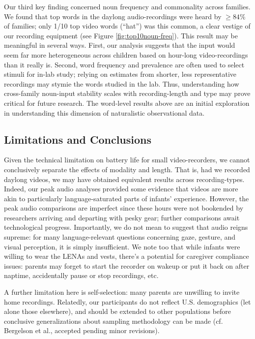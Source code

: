 \documentclass[man]{apa6}
\theoremstyle{definition}
\theoremstyle{definition}
\theoremstyle{definition}
\theoremstyle{remark}
\begin{document}
Our third key finding concerned noun frequency and commonality across
families. We found that top words in the daylong audio-recordings were
heard by \(\geq84\%\) of families; only 1/10 top video words
(\enquote{hat}) was this common, a clear vestige of our recording
equipment (see Figure \ref{fig:top10noun-freq}). This result may be
meaningful in several ways. First, our analysis suggests that the input
would seem far more heterogeneous across children based on hour-long
video-recordings than it really is. Second, word frequency and
prevalence are often used to select stimuli for in-lab study; relying on
estimates from shorter, less representative recordings may stymie the
words studied in the lab. Thus, understanding how cross-family
noun-input stability scales with recording-length and type may prove
critical for future research. The word-level results above are an
initial exploration in understanding this dimension of naturalistic
observational data.

\subsection{Limitations and
Conclusions}\label{limitations-and-conclusions}

Given the technical limitation on battery life for small
video-recorders, we cannot conclusively separate the effects of modality
and length. That is, had we recorded daylong videos, we may have
obtained equivalent results across recording-types. Indeed, our peak
audio analyses provided some evidence that videos are more akin to
particularly language-saturated parts of infants' experience. However,
the peak audio comparisons are imperfect since these hours were not
bookended by researchers arriving and departing with pesky gear; further
comparisons await technological progress. Importantly, we do not mean to
suggest that audio reigns supreme: for many language-relevant questions
concerning gaze, gesture, and visual perception, it is simply
insufficient. We note too that while infants were willing to wear the
LENAs and vests, there's a potential for caregiver compliance issues:
parents may forget to start the recorder on wakeup or put it back on
after naptime, accidentally pause or stop recordings, etc.

A further limitation here is self-selection: many parents are unwilling
to invite home recordings. Relatedly, our participants do not reflect
U.S. demographics (let alone those elsewhere), and should be extended to
other populations before conclusive generalizations about sampling
methodology can be made (cf. Bergelson et al., accepted pending minor
revisions).
\end{document}
